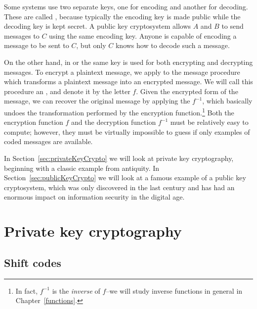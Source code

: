 Some systems  use two separate keys, one for encoding and another for
decoding. These are called , because typically the encoding key is made public
while the decoding key is kept secret. A public key
cryptosystem allows $A$ and $B$ to send messages to $C$ using the same
encoding key.  Anyone is capable of encoding a message to be sent to
$C$, but only $C$ knows how to decode such a message.
 
On the other hand, in  or
the same key is used for both encrypting and decrypting messages. To
encrypt a  plaintext message, we apply to the message procedure which transforms a  plaintext message into an encrypted message.  We will call this procedure an , and denote it by the letter $f$.  Given the encrypted form of the message, we can recover the 
original message by applying the  $f^{-1}$, which basically undoes the transformation performed by the encryption function.\footnote{In fact, $f^{-1}$ is the \emph{inverse} of $f$--we will study inverse functions in general in Chapter~\ref{functions}.} 
Both the
encryption function $f$ and the decryption function $f^{-1}$ must be relatively easy to compute; however, they must be virtually impossible to guess if only
examples of coded messages are available.

In Section~\ref{sec:privateKeyCrypto} we will look at private key cryptography, beginning  with a classic example from antiquity. In Section~\ref{sec:publicKeyCrypto} we will look at a famous example of a public key cryptosystem, 
which was only discovered in the last century and has had an enormous impact on information security in the digital age.
 
\section{Private key cryptography}
\label{sec:Cryptography:PrivateKey}
  
 
\subsection{Shift codes} 
 
